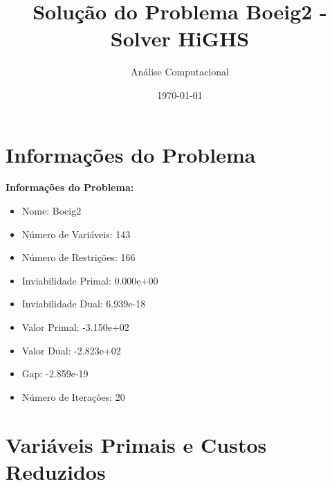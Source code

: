 \documentclass[12pt]{article}
\title{Solução do Problema Boeig2 - Solver HiGHS}
\author{Análise Computacional}
\date{\today}
\begin{document}
\maketitle

\section{Informações do Problema}

\textbf{Informações do Problema:}
\begin{itemize}
\item Nome: Boeig2
\item Número de Variáveis: 143
\item Número de Restrições: 166
\item Inviabilidade Primal: 0.000e+00
\item Inviabilidade Dual: 6.939e-18
\item Valor Primal: -3.150e+02
\item Valor Dual: -2.823e+02
\item Gap: -2.859e-19
\item Número de Iterações: 20
\end{itemize}


\section{Variáveis Primais e Custos Reduzidos}
\end{document}
